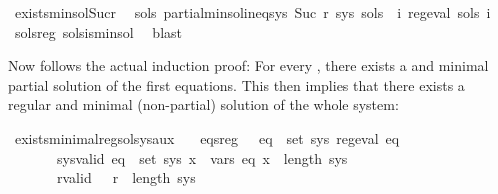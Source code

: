 \begin{isabellebody}
\isamarkupfalse%
\ exists{\isacharunderscore}{\kern0pt}min{\isacharunderscore}{\kern0pt}sol{\isacharunderscore}{\kern0pt}Suc{\isacharunderscore}{\kern0pt}r{\isacharcolon}{\kern0pt}\isanewline
\ \ {\isachardoublequoteopen}{\isasymexists}sols{\isacharprime}{\kern0pt}{\isachardot}{\kern0pt}\ partial{\isacharunderscore}{\kern0pt}min{\isacharunderscore}{\kern0pt}sol{\isacharunderscore}{\kern0pt}ineq{\isacharunderscore}{\kern0pt}sys\ {\isacharparenleft}{\kern0pt}Suc\ r{\isacharparenright}{\kern0pt}\ sys\ sols{\isacharprime}{\kern0pt}\ {\isasymand}\ {\isacharparenleft}{\kern0pt}{\isasymforall}i{\isachardot}{\kern0pt}\ reg{\isacharunderscore}{\kern0pt}eval\ {\isacharparenleft}{\kern0pt}sols{\isacharprime}{\kern0pt}\ i{\isacharparenright}{\kern0pt}{\isacharparenright}{\kern0pt}{\isachardoublequoteclose}\isanewline
%
\isadelimproof
\ \ %
\endisadelimproof
%
\isatagproof
{}\isamarkupfalse%
\ sols{\isacharprime}{\kern0pt}{\isacharunderscore}{\kern0pt}reg\ sols{\isacharprime}{\kern0pt}{\isacharunderscore}{\kern0pt}is{\isacharunderscore}{\kern0pt}min{\isacharunderscore}{\kern0pt}sol\ \isamarkupfalse%
\ blast%
\endisatagproof
{\isafoldproof}%
%
\isadelimproof
\isanewline
%
\endisadelimproof
\isanewline
{}\isamarkupfalse%
%
\begin{isamarkuptext}%
Now follows the actual induction proof: For every , there exists a  and minimal partial
solution of the first  equations. This then implies that there exists a regular and minimal (non-partial)
solution of the whole system:%
\end{isamarkuptext}\isamarkuptrue%
\isamarkupfalse%
\ exists{\isacharunderscore}{\kern0pt}minimal{\isacharunderscore}{\kern0pt}reg{\isacharunderscore}{\kern0pt}sol{\isacharunderscore}{\kern0pt}sys{\isacharunderscore}{\kern0pt}aux{\isacharcolon}{\kern0pt}\isanewline
\ \ \ eqs{\isacharunderscore}{\kern0pt}reg{\isacharcolon}{\kern0pt}\ \ \ {\isachardoublequoteopen}{\isasymforall}eq\ {\isasymin}\ set\ sys{\isachardot}{\kern0pt}\ reg{\isacharunderscore}{\kern0pt}eval\ eq{\isachardoublequoteclose}\isanewline
\ \ \ \ \ \ \ sys{\isacharunderscore}{\kern0pt}valid{\isacharcolon}{\kern0pt}\ {\isachardoublequoteopen}{\isasymforall}eq\ {\isasymin}\ set\ sys{\isachardot}{\kern0pt}\ {\isasymforall}x\ {\isasymin}\ vars\ eq{\isachardot}{\kern0pt}\ x\ {\isacharless}{\kern0pt}\ length\ sys{\isachardoublequoteclose}\isanewline
\ \ \ \ \ \ \ r{\isacharunderscore}{\kern0pt}valid{\isacharcolon}{\kern0pt}\ \ \ {\isachardoublequoteopen}r\ {\isasymle}\ length\ sys{\isachardoublequoteclose}\ \ \ \isanewline

\end{isabellebody}
